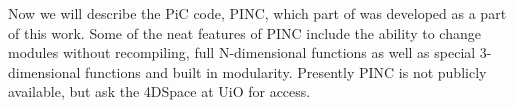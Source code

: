 	Now we will describe the PiC code, PINC, which part of was developed as
	a part of this work. Some of the neat features of PINC include the ability
	to change modules without recompiling, full N-dimensional functions as well
	as special 3-dimensional functions and built in modularity. Presently PINC is
	not publicly available, but ask the 4DSpace at UiO for access.
